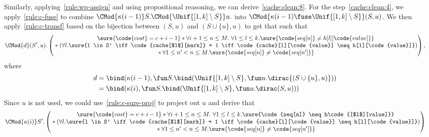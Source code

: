 Similarly, applying~\ref{rule:wp-assign} and using propositional reasoning,
we can derive~\eqref{cache:clean:8}.
For the step~\eqref{cache:clean:4}, we apply~\ref{rule:c-fuse} to combine
$\CMod{\kappa(i - 1)} S. \CMod{\Unif{[1,k] \setminus S}} u.$ into
$\CMod{\kappa(i - 1) \fuse \Unif{[1,k] \setminus S}} (S, u)$.
We then apply~\ref{rule:c-transf} based on the bijection between
$(S, u)$ and $(S \cup \{u\}, u)$ to get that
such that
\begin{align*}
  \CMod{d} (S', u).
          \begin{pmatrix}
          \sure{\code{cost} = c + i - 1}  \ast \forall i + 1 \leq n \leq M.\  \forall 1 \leq l \leq k. \sure{\code{seq[n]} \neq h[l][\code{value]}} \\
                 {} \ast  (\forall l. \sure{l \in S' \iff \code{cache[$l$][mark]} = 1 \iff \code{cache}[l][\code{value}] \neq h[l][\code{value}]}) \\
                 {} \ast \forall 1 \leq n' < n \leq M. \sure{\code{seq[n]} \neq \code{seq[n']}}\\
          \end{pmatrix},
\end{align*}
where
\begin{align*}
  d &= \bind(\kappa(i - 1), \fun S. \bind(\Unif{[1,k] \setminus S}, \fun u. \dirac{(S \cup \{u\},  u)})) \\
    &= \bind(\kappa(i ), \fun S. \bind(\Unif{[1,k] \setminus S}, \fun u. \dirac(S ,  u)))
\end{align*}
Since $u$ is not used,
we could use~\ref{rule:c-sure-proj} to project out $u$ and
derive that
\begin{align*}
  \CMod{\kappa(i)} S'.
          \begin{pmatrix}
                 \sure{\code{cost} = c + i - 1}  \ast  \forall i + 1 \leq n \leq M.\  \forall 1 \leq l \leq k. \sure{\code{seq[n]} \neq h\code{[$l$][value]}} \\
                 {} \ast (\forall l. \sure{l \in S' \iff \code{cache[$l$][mark]} = 1 \iff \code{cache}[l][\code{value}] \neq h[l][\code{value}]}) \\
                 {} \ast \forall 1 \leq n' < n \leq M. \sure{\code{seq[n]} \neq \code{seq[n']}}\\
          \end{pmatrix}
\end{align*}


